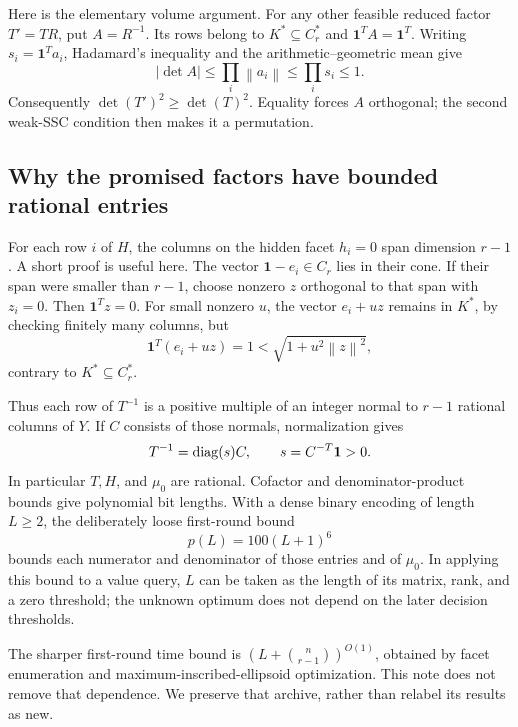 \documentclass[11pt]{article}
\theoremstyle{definition}\newtheorem{definition}[theorem]{Definition}
\newcommand{\e}{\mathbf1}\newcommand{\cone}{\operatorname{cone}}
\newcommand{\norm}[1]{\left\lVert#1\right\rVert}\newcommand{\Tr}{\mathcal T}
\begin{document}
Here is the elementary volume argument. For any other feasible reduced factor $T'=TR$, put $A=R^{-1}$. Its rows belong to $K^*\subseteq C_r^*$ and $\e^TA=\e^T$. Writing $s_i=\e^Ta_i$, Hadamard's inequality and the arithmetic--geometric mean give
\begin{equation}
 |\det A|\le\prod_i\norm{a_i}\le\prod_i s_i\le1.
 \label{eq:detbound}
\end{equation}
Consequently $\det(T')^2\ge\det(T)^2$. Equality forces $A$ orthogonal; the second weak-SSC condition then makes it a permutation.

\subsection{Why the promised factors have bounded rational entries}
For each row $i$ of $H$, the columns on the hidden facet $h_i=0$ span dimension $r-1$. A short proof is useful here. The vector $\e-e_i\in C_r$ lies in their cone. If their span were smaller than $r-1$, choose nonzero $z$ orthogonal to that span with $z_i=0$. Then $\e^Tz=0$. For small nonzero $u$, the vector $e_i+uz$ remains in $K^*$, by checking finitely many columns, but
\[
 \e^T(e_i+uz)=1<\sqrt{1+u^2\norm{z}^2},
\]
contrary to $K^*\subseteq C_r^*$.

Thus each row of $T^{-1}$ is a positive multiple of an integer normal to $r-1$ rational columns of $Y$. If $C$ consists of those normals, normalization gives
\begin{equation}
 T^{-1}=\diag(s)C,\qquad s=C^{-T}\e>0.
 \label{eq:normalrecovery}
\end{equation}
In particular $T,H$, and $\mu_0$ are rational. Cofactor and denominator-product bounds give polynomial bit lengths. With a dense binary encoding of length $L\ge2$, the deliberately loose first-round bound
\begin{equation}
 p(L)=100(L+1)^6
 \label{eq:pbound}
\end{equation}
bounds each numerator and denominator of those entries and of $\mu_0$. In applying this bound to a value query, $L$ can be taken as the length of its matrix, rank, and a zero threshold; the unknown optimum does not depend on the later decision thresholds.

The sharper first-round time bound is $(L+\binom{n}{r-1})^{O(1)}$, obtained by facet enumeration and maximum-inscribed-ellipsoid optimization. This note does not remove that dependence. We preserve that archive, rather than relabel its results as new.
\end{document}
